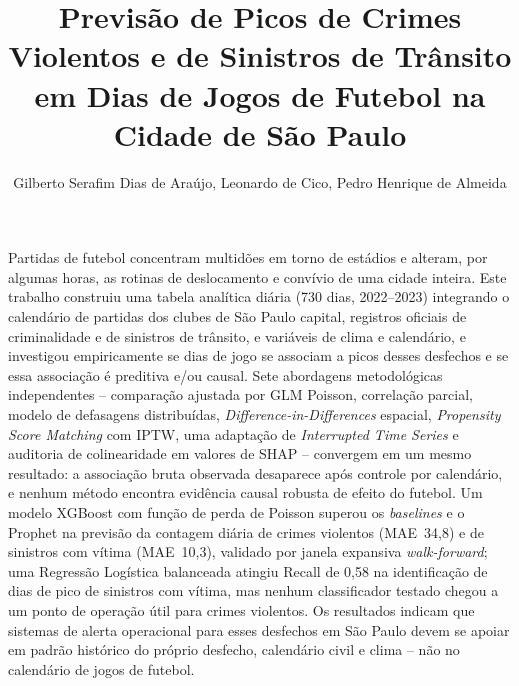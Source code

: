 \documentclass[12pt]{article}
\title{Previsão de Picos de Crimes Violentos e de Sinistros de Trânsito em
Dias de Jogos de Futebol na Cidade de São Paulo}
\author{Gilberto Serafim Dias de Araújo\inst{1}, Leonardo de Cico\inst{1},
Pedro Henrique de Almeida\inst{1}}
\begin{document}
\maketitle

\begin{resumo}
Partidas de futebol concentram multidões em torno de estádios e alteram, por
algumas horas, as rotinas de deslocamento e convívio de uma cidade inteira.
Este trabalho construiu uma tabela analítica diária (730 dias, 2022--2023)
integrando o calendário de partidas dos clubes de São Paulo capital,
registros oficiais de criminalidade e de sinistros de trânsito, e variáveis
de clima e calendário, e investigou empiricamente se dias de jogo se
associam a picos desses desfechos e se essa associação é preditiva e/ou
causal. Sete abordagens metodológicas independentes -- comparação ajustada
por GLM Poisson, correlação parcial, modelo de defasagens distribuídas,
\emph{Difference-in-Differences} espacial, \emph{Propensity Score Matching}
com IPTW, uma adaptação de \emph{Interrupted Time Series} e auditoria de
colinearidade em valores de SHAP -- convergem em um mesmo resultado: a
associação bruta observada desaparece após controle por calendário, e
nenhum método encontra evidência causal robusta de efeito do futebol. Um
modelo XGBoost com função de perda de Poisson superou os \emph{baselines}
e o Prophet na previsão da contagem diária de crimes violentos (MAE~34,8) e
de sinistros com vítima (MAE~10,3), validado por janela expansiva
\emph{walk-forward}; uma Regressão Logística balanceada atingiu Recall de
0,58 na identificação de dias de pico de sinistros com vítima, mas nenhum
classificador testado chegou a um ponto de operação útil para crimes
violentos. Os resultados indicam que sistemas de alerta operacional para
esses desfechos em São Paulo devem se apoiar em padrão histórico do próprio
desfecho, calendário civil e clima -- não no calendário de jogos de
futebol.
\end{resumo}
\end{document}
